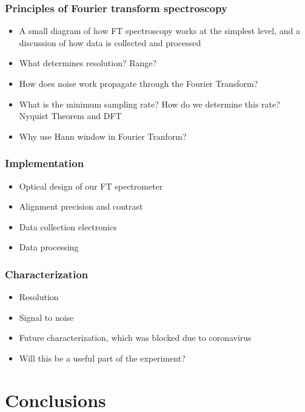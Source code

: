 \documentclass[12pt]{puthesis}
\begin{document}
\subsection{Principles of Fourier transform spectroscopy}
\begin{itemize}
\item A small diagram of how FT spectroscopy works at the simplest level, and a discussion of how data is collected and processed

\item What determines resolution? Range?

\item How does noise work propagate through the Fourier Transform?

\item What is the minimum sampling rate? How do we determine this rate? Nyquist Theorem and DFT 

\item Why use Hann window in Fourier Tranform?
\end{itemize}

\subsection{Implementation}
\begin{itemize}
\item Optical design of our FT spectrometer 

\item Alignment precision and contrast

\item Data collection electronics 

\item Data processing 
\end{itemize}

\subsection{Characterization}
\begin{itemize}
\item Resolution

\item Signal to noise 

\item Future characterization, which was blocked due to coronavirus 

\item Will this be a useful part of the experiment?
\end{itemize}



\chapter{Conclusions}





\singlespacing

\cleardoublepage
\ifdefined{}
\else
\fi
{}

\end{document}
